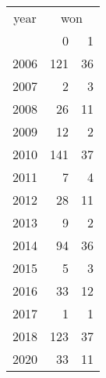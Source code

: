 \footnotesize\begin{tabular}[t]{lrr}
\toprule
\multicolumn{1}{c}{year} & \multicolumn{2}{c}{won} \\
\cmidrule(l{3pt}r{3pt}){1-1} \cmidrule(l{3pt}r{3pt}){2-3}
  & 0 & 1\\
\midrule
2006 & 121 & 36\\
2007 & 2 & 3\\
2008 & 26 & 11\\
2009 & 12 & 2\\
2010 & 141 & 37\\
2011 & 7 & 4\\
2012 & 28 & 11\\
2013 & 9 & 2\\
2014 & 94 & 36\\
2015 & 5 & 3\\
2016 & 33 & 12\\
2017 & 1 & 1\\
2018 & 123 & 37\\
2020 & 33 & 11\\
\bottomrule
\end{tabular}
